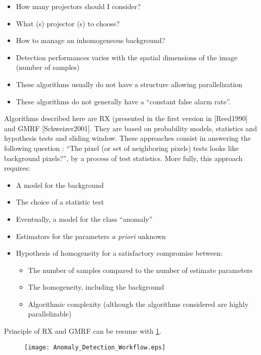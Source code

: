\begin{itemize} 
\item How many projectors should I consider?  
\item What (s) projector (s) to choose?  
\item How to manage an inhomogeneous background?  
\item Detection performances varies with the spatial dimensions of the image (number of samples) 
\item These algorithms usually do not have a structure allowing parallelization
\item These algorithms do not generally have a ``constant false alarm rate''.
\end{itemize}

Algorithms described here are RX (presented in the first version
in [Reed1990] and GMRF [Schweizer2001]. They are based on probability models, statistics and hypothesis tests and
sliding window. These approaches consist in answering the following question : ``The pixel (or set of neighboring pixels) tests looks like background pixels?'', by a process of test
statistics. More fully, this approach requires:

\begin{itemize} 
\item A model for the background 
\item The choice of a statistic test 
\item Eventually, a model for the class ``anomaly''
\item Estimators for the parameters \textit{a priori} unknown
\item Hypothesis of homogeneity for a satisfactory compromise between:
\begin{itemize} 
\item The number of samples compared to the number of estimate parameters 
\item The homogeneity, including the background 
\item Algorithmic complexity (although the algorithms considered are
highly parallelizable)
\end{itemize} 
\end{itemize} 
Principle of RX and GMRF can be resume with \ref{fig:workflow_anomaly}.

\begin{figure}[h]
  \centering
  \texttt{[image: Anomaly\_Detection\_Workflow.eps]}
  \label{fig:workflow_anomaly}
\end{figure}

